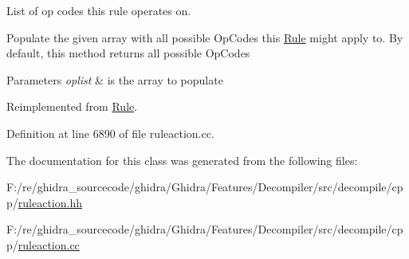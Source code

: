 List of op codes this rule operates on. 

Populate the given array with all possible Op\+Codes this \mbox{\hyperlink{class_rule}{Rule}} might apply to. By default, this method returns all possible Op\+Codes 
\begin{DoxyParams}{Parameters}
{\em oplist} & is the array to populate \\
\hline
\end{DoxyParams}


Reimplemented from \mbox{\hyperlink{class_rule_a4023bfc7825de0ab866790551856d10e}{Rule}}.



Definition at line 6890 of file ruleaction.\+cc.



The documentation for this class was generated from the following files\+:\begin{DoxyCompactItemize}
\item 
F\+:/re/ghidra\+\_\+sourcecode/ghidra/\+Ghidra/\+Features/\+Decompiler/src/decompile/cpp/\mbox{\hyperlink{ruleaction_8hh}{ruleaction.\+hh}}\item 
F\+:/re/ghidra\+\_\+sourcecode/ghidra/\+Ghidra/\+Features/\+Decompiler/src/decompile/cpp/\mbox{\hyperlink{ruleaction_8cc}{ruleaction.\+cc}}\end{DoxyCompactItemize}
